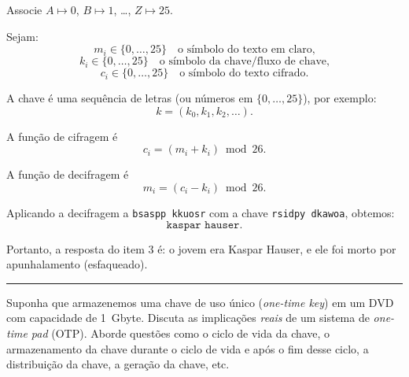 \documentclass[12pt,a4paper]{article}
\newcommand{\exercicio}[1]{%
    \par\vspace{1.2em}
    \noindent
    {\color{black!55}\rule[-0.25em]{3pt}{1.6em}}%
    \hspace{0.6em}{\Large\bfseries Exerc\'{i}cio #1}
    \par\vspace{-0.4em}
    \noindent{\color{black!35}\rule{\textwidth}{0.4pt}}
    \par\vspace{0.35em}
}
\newenvironment{resposta}{%
    \begin{respostabox}
    \color{red!70!black}\sloppy
}{%
    \end{respostabox}
}
\begin{document}
\begin{resposta}

Associe $A \mapsto 0$, $B \mapsto 1$, \ldots, $Z \mapsto 25$.

Sejam:
\[
m_i \in \{0,\ldots,25\} \quad \text{o símbolo do texto em claro,}
\]
\[
k_i \in \{0,\ldots,25\} \quad \text{o símbolo da chave/fluxo de chave,}
\]
\[
c_i \in \{0,\ldots,25\} \quad \text{o símbolo do texto cifrado.}
\]

A chave é uma sequência de letras (ou números em $\{0,\ldots,25\}$), por exemplo:
\[
k = (k_0, k_1, k_2, \ldots).
\]

A função de cifragem é
\[
c_i = (m_i + k_i) \bmod 26.
\]

A função de decifragem é
\[
m_i = (c_i - k_i) \bmod 26.
\]

Aplicando a decifragem a \texttt{bsaspp kkuosr} com a chave \texttt{rsidpy dkawoa}, obtemos:
\[
\texttt{kaspar hauser}.
\]

Portanto, a resposta do item 3 é: o jovem era Kaspar Hauser, e ele foi morto por apunhalamento (esfaqueado).
\end{resposta}

\exercicio{2}
Suponha que armazenemos uma chave de uso único (\emph{one-time key}) em um DVD com capacidade de 1~Gbyte. Discuta as implicações \emph{reais} de um sistema de \emph{one-time pad} (OTP). Aborde questões como o ciclo de vida da chave, o armazenamento da chave durante o ciclo de vida e após o fim desse ciclo, a distribuição da chave, a geração da chave, etc.
\end{document}
